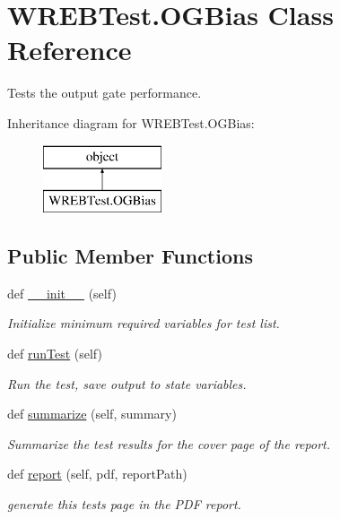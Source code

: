 \hypertarget{class_w_r_e_b_test_1_1_o_g_bias}{}\section{W\+R\+E\+B\+Test.\+O\+G\+Bias Class Reference}
\label{class_w_r_e_b_test_1_1_o_g_bias}


Tests the output gate performance.  


Inheritance diagram for W\+R\+E\+B\+Test.\+O\+G\+Bias\+:\begin{figure}[H]
\begin{center}
\leavevmode
\includegraphics[height=2.000000cm]{class_w_r_e_b_test_1_1_o_g_bias}
\end{center}
\end{figure}
\subsection*{Public Member Functions}
\begin{DoxyCompactItemize}
\item 
def \hyperlink{class_w_r_e_b_test_1_1_o_g_bias_a54e5379325a6a8707049e5287b4a540b}{\+\_\+\+\_\+init\+\_\+\+\_\+} (self)
\begin{DoxyCompactList}\small\item\em Initialize minimum required variables for test list. \end{DoxyCompactList}\item 
def \hyperlink{class_w_r_e_b_test_1_1_o_g_bias_ab3882e57d4909ecab2f9a255661df21d}{run\+Test} (self)
\begin{DoxyCompactList}\small\item\em Run the test, save output to state variables. \end{DoxyCompactList}\item 
def \hyperlink{class_w_r_e_b_test_1_1_o_g_bias_a9efac6be807016d3ed4359aae56e15a8}{summarize} (self, summary)
\begin{DoxyCompactList}\small\item\em Summarize the test results for the cover page of the report. \end{DoxyCompactList}\item 
def \hyperlink{class_w_r_e_b_test_1_1_o_g_bias_a031d4b9bde53c91eeb095d19c2f5576f}{report} (self, pdf, report\+Path)
\begin{DoxyCompactList}\small\item\em generate this test\textquotesingle{}s page in the P\+DF report. \end{DoxyCompactList}\end{DoxyCompactItemize}


